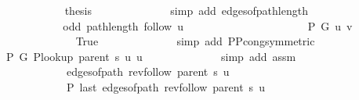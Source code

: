 \begin{isabellebody}
\ \ \ \ \ \ \ \ \ \ \isamarkupfalse%
\ {\isacharquery}{\kern0pt}thesis\isanewline
\ \ \ \ \ \ \ \ \ \ \ \ \isamarkupfalse%
\ {\isacharparenleft}{\kern0pt}simp\ add{\isacharcolon}{\kern0pt}\ edges{\isacharunderscore}{\kern0pt}of{\isacharunderscore}{\kern0pt}path{\isacharunderscore}{\kern0pt}length{\isacharparenright}{\kern0pt}\isanewline
\ \ \ \ \ \ \ \ \isamarkupfalse%
\isanewline
\ \ \ \ \ \ \ \ \isamarkupfalse%
\ \isamarkupfalse%
\ {\isachardoublequoteopen}odd\ {\isacharparenleft}{\kern0pt}path{\isacharunderscore}{\kern0pt}length\ {\isacharparenleft}{\kern0pt}follow\ u{\isacharparenright}{\kern0pt}{\isacharparenright}{\kern0pt}{\isachardoublequoteclose}\isanewline
\ \ \ \ \ \ \ \ \isamarkupfalse%
\ {\isacharminus}{\kern0pt}\isanewline
\ \ \ \ \ \ \ \ \ \ \isamarkupfalse%
\ {\isachardoublequoteopen}P\ G{}\ u\ v{\isachardoublequoteclose}\isanewline
\ \ \ \ \ \ \ \ \ \ \ \ \isamarkupfalse%
\ True\isanewline
\ \ \ \ \ \ \ \ \ \ \ \ \isamarkupfalse%
\ {\isacharparenleft}{\kern0pt}simp\ add{\isacharcolon}{\kern0pt}\ P{\isacharunderscore}{\kern0pt}P{\isacharprime}{\kern0pt}{\isacharprime}{\kern0pt}{\isacharunderscore}{\kern0pt}cong{\isacharbrackleft}{\kern0pt}symmetric{\isacharbrackright}{\kern0pt}{\isacharparenright}{\kern0pt}\isanewline
\ \ \ \ \ \ \ \ \ \ \isamarkupfalse%
\ {\isachardoublequoteopen}P{\isacharprime}{\kern0pt}\ G{}\ {\isacharparenleft}{\kern0pt}P{\isacharunderscore}{\kern0pt}lookup\ {\isacharparenleft}{\kern0pt}parent\ s{\isacharparenright}{\kern0pt}\ u{\isacharparenright}{\kern0pt}\ u{\isachardoublequoteclose}\isanewline
\ \ \ \ \ \ \ \ \ \ \ \ \isamarkupfalse%
\ {\isacharparenleft}{\kern0pt}simp\ add{\isacharcolon}{\kern0pt}\ assm{\isacharparenright}{\kern0pt}\isanewline
\ \ \ \ \ \ \ \ \ \ \isamarkupfalse%
\isanewline
\ \ \ \ \ \ \ \ \ \ \ \ {\isachardoublequoteopen}edges{\isacharunderscore}{\kern0pt}of{\isacharunderscore}{\kern0pt}path\ {\isacharparenleft}{\kern0pt}rev{\isacharunderscore}{\kern0pt}follow\ {\isacharparenleft}{\kern0pt}parent\ s{\isacharparenright}{\kern0pt}\ u{\isacharparenright}{\kern0pt}\ {\isasymnoteq}\ {\isacharbrackleft}{\kern0pt}{\isacharbrackright}{\kern0pt}{\isachardoublequoteclose}\isanewline
\ \ \ \ \ \ \ \ \ \ \ \ {\isachardoublequoteopen}P{\isacharprime}{\kern0pt}{\isacharprime}{\kern0pt}\ {\isacharparenleft}{\kern0pt}last\ {\isacharparenleft}{\kern0pt}edges{\isacharunderscore}{\kern0pt}of{\isacharunderscore}{\kern0pt}path\ {\isacharparenleft}{\kern0pt}rev{\isacharunderscore}{\kern0pt}follow\ {\isacharparenleft}{\kern0pt}parent\ s{\isacharparenright}{\kern0pt}\ u{\isacharparenright}{\kern0pt}{\isacharparenright}{\kern0pt}{\isacharparenright}{\kern0pt}{\isachardoublequoteclose}\isanewline

\end{isabellebody}
